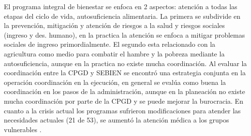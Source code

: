 El programa integral de bienestar se enfoca en 2 aspectos: atención a todas las etapas del ciclo de vida, autosuficiencia alimentaria. La primera se subdivide en la prevención, mitigación y atención de riesgos a la salud y riesgos sociales (ingreso y des. humano), en la practica la atención se enfoca a mitigar problemas sociales de ingreso primordialmente. El segundo esta relacionado con la agricultura como medio para combatir el hambre y la pobreza mediante la autosuficiencia, aunque en la practica no existe mucha coordinación.
Al evaluar la coordinación entre la CPGD y SEBIEN se encontró una estrategia conjunta en la operación coordinación en la ejecución, en general se evalúa como buena la coordinación en los pasos de la administración, aunque en la planeación no existe mucha coordinación por parte de la CPGD y se puede mejorar la burocracia. En cuanto a la crisis actual los programas sufrieron modificaciones para atender las necesidades actuales (21 de 53), se aumentó la atención médica a los grupos vulnerables \cite{CONEVALDesarrolloSocial}.